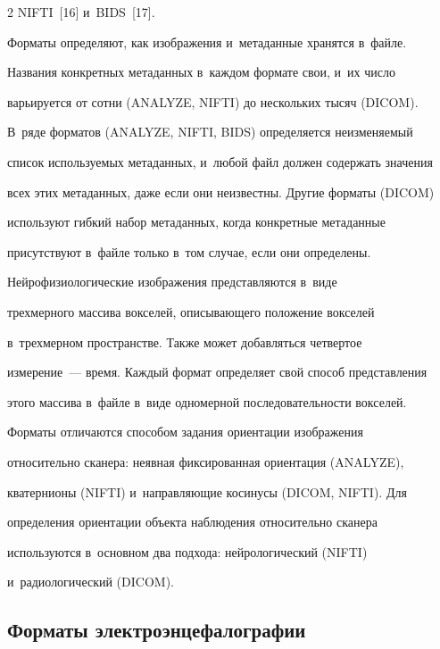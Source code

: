 \begin{multicols}{2}
NIFTI~[16] и~BIDS~[17].


    


    Форматы определяют, как изображения и~метаданные хранятся в~файле. 


Названия конкретных метаданных в~каждом формате свои, и~их число 


варь\-и\-ру\-ет\-ся от сотни (\mbox{ANALYZE}, NIFTI) до нескольких тысяч (DICOM). 


В~ряде форматов (\mbox{ANALYZE}, \mbox{NIFTI}, \mbox{BIDS}) определяется неизменяемый 


список используемых метаданных, и~любой файл должен содержать значения 


всех этих метаданных, даже если они неизвестны. Другие форматы (DICOM) 


используют гибкий набор метаданных, когда конкретные метаданные 


присутствуют в~файле только в~том случае, если они определены.


    


    Нейрофизиологические изображения пред\-ставля\-ются в~виде 


трехмерного массива вокселей, описывающего положение вокселей 


в~трехмерном пространстве. Также может добавляться четвертое 


измерение~--- время. Каждый формат определяет свой способ представления 


этого массива в~файле в~виде одномерной последовательности вокселей. 


Форматы отличаются способом задания ориентации изображения 


относительно сканера: неявная фиксированная ориентация (\mbox{ANALYZE}), 


кватернионы (NIFTI) и~направляющие косинусы (\mbox{DICOM}, NIFTI). Для 


определения ориентации объекта наблюдения относительно сканера 


используются в~основном два подхода: нейрологический (NIFTI) 


и~радиологический (DICOM).





\vspace*{-4pt}


    


\subsection{Форматы электроэнцефалографии}






\end{multicols}
